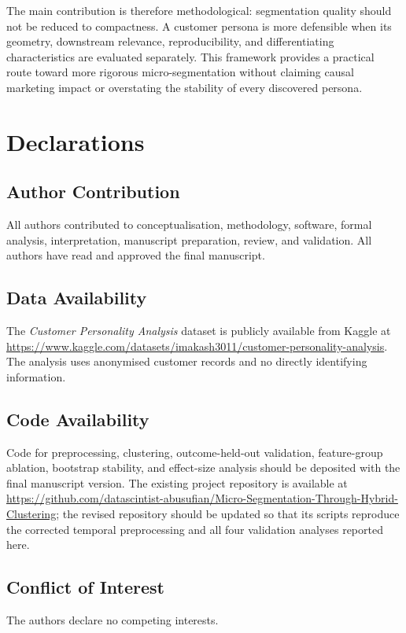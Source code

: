 \documentclass[10pt]{article}
\begin{document}
The main contribution is therefore methodological: segmentation quality should not be reduced to compactness. A customer persona is more defensible when its geometry, downstream relevance, reproducibility, and differentiating characteristics are evaluated separately. This framework provides a practical route toward more rigorous micro-segmentation without claiming causal marketing impact or overstating the stability of every discovered persona.

\section*{Declarations}
\subsection*{Author Contribution}
All authors contributed to conceptualisation, methodology, software, formal analysis, interpretation, manuscript preparation, review, and validation. All authors have read and approved the final manuscript.

\subsection*{Data Availability}
The \textit{Customer Personality Analysis} dataset is publicly available from Kaggle at \url{https://www.kaggle.com/datasets/imakash3011/customer-personality-analysis}. The analysis uses anonymised customer records and no directly identifying information.

\subsection*{Code Availability}
Code for preprocessing, clustering, outcome-held-out validation, feature-group ablation, bootstrap stability, and effect-size analysis should be deposited with the final manuscript version. The existing project repository is available at \url{https://github.com/datascintist-abusufian/Micro-Segmentation-Through-Hybrid-Clustering}; the revised repository should be updated so that its scripts reproduce the corrected temporal preprocessing and all four validation analyses reported here.

\subsection*{Conflict of Interest}
The authors declare no competing interests.
\end{document}
